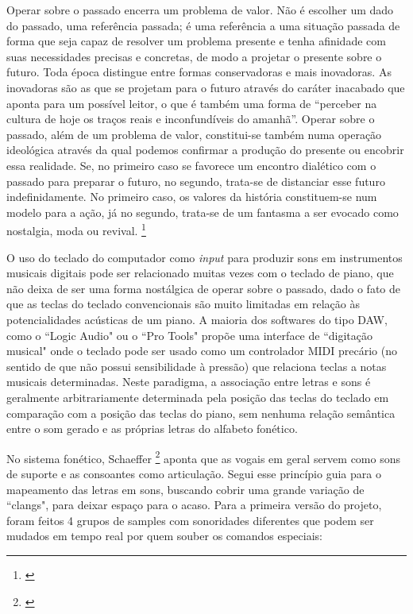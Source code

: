 \begin{citacao}
Operar sobre o passado encerra um problema de valor. Não é escolher um dado do passado, uma referência passada; é uma referência a uma situação passada de forma que seja capaz de resolver um problema presente e tenha afinidade com suas necessidades precisas e concretas, de modo a projetar o presente sobre o futuro. Toda época distingue entre formas conservadoras e mais inovadoras. As inovadoras são as que se projetam para o futuro através do caráter inacabado que aponta para um possível leitor, o que é também uma forma de ``perceber na cultura de hoje os traços reais e inconfundíveis do amanhã''. Operar sobre o passado, além de um problema de valor, constitui-se também numa operação ideológica através da qual podemos confirmar a produção do presente ou encobrir essa realidade. Se, no primeiro caso se favorece um encontro dialético com o passado para preparar o futuro, no segundo, trata-se de distanciar esse futuro indefinidamente. No primeiro caso, os valores da história constituem-se num modelo para a ação, já no segundo, trata-se de um fantasma a ser evocado como nostalgia, moda ou revival. \footnote{\cite{JulioPlaza1969}}
\end{citacao}

O uso do teclado do computador como \emph{input} para produzir sons em instrumentos musicais digitais pode ser relacionado muitas vezes com o teclado de piano, que não deixa de ser uma forma nostálgica de operar sobre o passado, dado o fato de que as teclas do teclado convencionais são muito limitadas em relação às potencialidades acústicas de um piano. A maioria dos softwares do tipo DAW, como o ``Logic Audio" ou o ``Pro Tools" propõe uma interface de ``digitação musical" onde o teclado pode ser usado como um controlador MIDI precário (no sentido de que não possui sensibilidade à pressão) que relaciona teclas a notas musicais determinadas. Neste paradigma, a associação entre letras e sons é geralmente arbitrariamente determinada pela posição das teclas do teclado em comparação com a posição das teclas do piano, sem nenhuma relação semântica entre o som gerado e as próprias letras do alfabeto fonético. 


No sistema fonético, Schaeffer \footnote{\cite{Schaeffer2007}} aponta que as vogais em geral servem como sons de suporte e as consoantes como articulação. Segui esse princípio guia para o mapeamento das letras em sons, buscando cobrir uma grande variação de ``clangs", para deixar espaço para o acaso. Para a primeira versão do projeto, foram feitos 4 grupos de samples com sonoridades diferentes que podem ser mudados em tempo real por quem souber os comandos especiais: 

